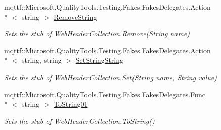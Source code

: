 \begin{DoxyCompactItemize}
mqttf\-::\-Microsoft.\-Quality\-Tools.\-Testing.\-Fakes.\-Fakes\-Delegates.\-Action\\*
$<$ string $>$ \hyperlink{class_system_1_1_net_1_1_fakes_1_1_stub_web_header_collection_ad7e1ffd11541286d233c1b29f353f984}{Remove\-String}
\begin{DoxyCompactList}\small\item\em Sets the stub of Web\-Header\-Collection.\-Remove(\-String name)\end{DoxyCompactList}\item 
mqttf\-::\-Microsoft.\-Quality\-Tools.\-Testing.\-Fakes.\-Fakes\-Delegates.\-Action\\*
$<$ string, string $>$ \hyperlink{class_system_1_1_net_1_1_fakes_1_1_stub_web_header_collection_a21b90b6202e673e5910dab0a33976ca6}{Set\-String\-String}
\begin{DoxyCompactList}\small\item\em Sets the stub of Web\-Header\-Collection.\-Set(\-String name, String value)\end{DoxyCompactList}\item 
mqttf\-::\-Microsoft.\-Quality\-Tools.\-Testing.\-Fakes.\-Fakes\-Delegates.\-Func\\*
$<$ string $>$ \hyperlink{class_system_1_1_net_1_1_fakes_1_1_stub_web_header_collection_aeddf74c1f4f3b099560d1920d55f80ce}{To\-String01}
\begin{DoxyCompactList}\small\item\em Sets the stub of Web\-Header\-Collection.\-To\-String()\end{DoxyCompactList}\end{DoxyCompactItemize}
